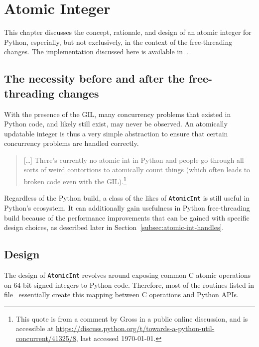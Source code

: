 \chapter{Atomic Integer}\label{ch:atomic-int}

This chapter discusses the concept, rationale, and design of an atomic integer for Python, especially, but not exclusively, in the context of the free-threading changes.
The implementation discussed here is available in~\cite[src/cereggii/atomic\_int]{cereggii}.


\section[The necessity before and after the free-threading changes]{The necessity before and after the free-\\threading changes}\label{sec:the-necessity-before-and-after-the-free-threading-changes}

With the presence of the GIL, many concurrency problems that existed in Python code, and likely still exist, may never be observed.
An atomically updatable integer is thus a very simple abstraction to ensure that certain concurrency problems are handled correctly.

\begin{quote}
    [\ldots] There's currently no atomic int in Python and people go through all sorts of weird contortions to atomically count things (which often leads to broken code even with the GIL).\footnote{%
    This quote is from a comment by Gross in a public online discussion, and is accessible at \url{https://discuss.python.org/t/towards-a-python-util-concurrent/41325/8}, last accessed \today.
}
\end{quote}

Regardless of the Python build, a class of the likes of \texttt{AtomicInt} is still useful in Python's ecosystem.
It can additionally gain usefulness in Python free-threading build because of the performance improvements that can be gained with specific design choices, as described later in Section~\ref{subsec:atomic-int-handles}.


\section{Design}\label{sec:atomic-int-design}

The design of \texttt{AtomicInt} revolves around exposing common C atomic operations on 64-bit signed integers to Python code.
Therefore, most of the routines listed in file~\cite[src/cereggii/atomic\_int/atomic\_int.c]{cereggii} essentially create this mapping between C operations and Python APIs.


